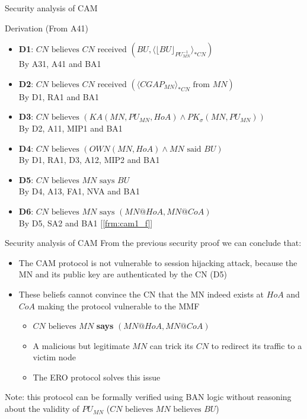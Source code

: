 \documentclass[10pt]{beamer}
\newcommand{\xtext}[1]{\text{ #1 }}
\begin{document}
\begin{frame}[label={frm:cam_derivation}]{Security analysis of CAM}
	\begin{block}{Derivation}
		\label{frm:cam1_s}
		(From A41)
		\begin{itemize}
			\item \textbf{D1}: $CN \xtext{believes} CN \xtext{received} (BU, \langle\lfloor BU\rfloor_{PU_{MN}^{-1}}\rangle_{*CN})$ \\ \hspace{1.7cm} By A31, A41 and BA1
			\item \textbf{D2}: $CN \xtext{believes} CN \xtext{received} (\langle CGAP_{MN}\rangle_{*CN} \xtext{from} MN)$ \\ \hspace{1.7cm} By D1, RA1 and BA1
			\item \textbf{D3}: $CN \xtext{believes} (KA(MN, PU_{MN}, HoA) \land PK_\sigma(MN, PU_{MN}))$ \\ \hspace{1.7cm} By D2, A11, MIP1 and BA1
			\item \textbf{D4}: $CN \xtext{believes} (OWN(MN,HoA) \land MN \xtext{said} BU)$ \\ \hspace{1.7cm} By D1, RA1, D3, A12, MIP2 and BA1
			\item \textbf{D5}: $CN \xtext{believes} MN \xtext{says} BU$ \\ \hspace{1.7cm} By D4, A13, FA1, NVA and BA1
			\item \textbf{D6}: $CN \xtext{believes} MN \xtext{says} (MN@HoA,MN@CoA)$ \\ \hspace{1.7cm} By D5, SA2 and BA1 [\underline{\ref{frm:cam1_f}}]
		\end{itemize}
	\end{block}
\end{frame}
\begin{frame}{Security analysis of CAM}
	From the previous security proof we can conclude that:
	\begin{itemize}
		\item The CAM protocol \alert{is not vulnerable to session hijacking attack}, because the MN and its public key are authenticated by the CN (D5)
		\item These beliefs cannot convince the CN that the MN indeed exists at $HoA$ and $CoA$ making the protocol vulnerable to the MMF
		\begin{itemize}
			\item $CN \xtext{believes} MN$ \textbf{says} $(MN@HoA,MN@CoA)$
			\item A malicious but legitimate $MN$ can trick its $CN$ to redirect \alert{its} traffic to a victim node
		\item The ERO protocol solves this issue
		\end{itemize}
	\end{itemize}
	\alert{Note:} this protocol can be formally verified using BAN logic without reasoning about the validity of $PU_{MN}$ ($CN \xtext{believes} MN \xtext{believes} BU$)
\end{frame}
\end{document}
